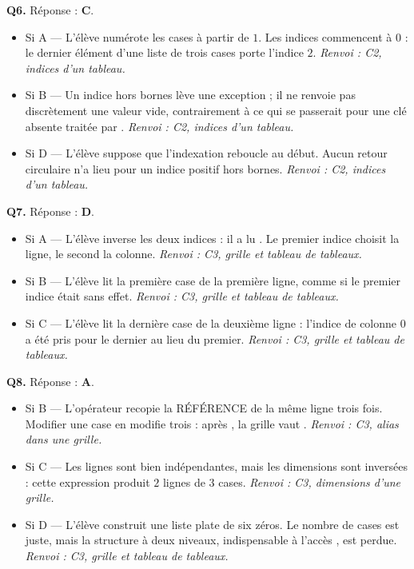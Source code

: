 \textbf{Q6.} Réponse : \textbf{C}.
\begin{itemize}[nosep]
  \item Si A — L'élève numérote les cases à partir de $1$. Les indices commencent à $0$ : le dernier élément d'une liste de trois cases porte l'indice $2$. \emph{Renvoi : C2, indices d'un tableau.}
  \item Si B — Un indice hors bornes lève une exception ; il ne renvoie pas discrètement une valeur vide, contrairement à ce qui se passerait pour une clé absente traitée par . \emph{Renvoi : C2, indices d'un tableau.}
  \item Si D — L'élève suppose que l'indexation reboucle au début. Aucun retour circulaire n'a lieu pour un indice positif hors bornes. \emph{Renvoi : C2, indices d'un tableau.}
\end{itemize}

\textbf{Q7.} Réponse : \textbf{D}.
\begin{itemize}[nosep]
  \item Si A — L'élève inverse les deux indices : il a lu . Le premier indice choisit la ligne, le second la colonne. \emph{Renvoi : C3, grille et tableau de tableaux.}
  \item Si B — L'élève lit la première case de la première ligne, comme si le premier indice était sans effet. \emph{Renvoi : C3, grille et tableau de tableaux.}
  \item Si C — L'élève lit la dernière case de la deuxième ligne : l'indice de colonne $0$ a été pris pour le dernier au lieu du premier. \emph{Renvoi : C3, grille et tableau de tableaux.}
\end{itemize}

\textbf{Q8.} Réponse : \textbf{A}.
\begin{itemize}[nosep]
  \item Si B — L'opérateur \code{*} recopie la RÉFÉRENCE de la même ligne trois fois. Modifier une case en modifie trois : après , la grille vaut \code{[[9, 0], [9, 0], [9, 0]]}. \emph{Renvoi : C3, alias dans une grille.}
  \item Si C — Les lignes sont bien indépendantes, mais les dimensions sont inversées : cette expression produit $2$ lignes de $3$ cases. \emph{Renvoi : C3, dimensions d'une grille.}
  \item Si D — L'élève construit une liste plate de six zéros. Le nombre de cases est juste, mais la structure à deux niveaux, indispensable à l'accès , est perdue. \emph{Renvoi : C3, grille et tableau de tableaux.}
\end{itemize}

